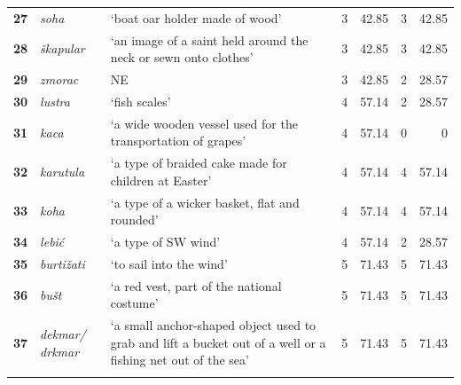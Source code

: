 \documentclass[output=paper]{LSP/langsci}
\begin{document}
\begin{table}
{\begin{tabular}{lp{2cm}p{5cm}lrlr}
{\bfseries 27} & {\itshape soha} & `boat oar holder made of wood' & 3 & 42.85 & 3 & 42.85\\

{\bfseries 28} & {\itshape škapular} & `an image of a saint held around the neck or sewn onto clothes' & 3 & 42.85 & 3 & 42.85\\

{\bfseries 29} & {\itshape zmorac} & NE & 3 & 42.85 & 2 & 28.57\\

{\bfseries 30} & {\itshape lustra} & `fish scales' & 4 & 57.14 & 2 & 28.57\\

{\bfseries 31} & {\itshape kaca} & `a wide wooden vessel used for the transportation of grapes' & 4 & 57.14 & 0 & 0\\

{\bfseries 32} & {\itshape karutula} & `a type of braided cake made for children at Easter' & 4 & 57.14 & 4 & 57.14\\

{\bfseries 33} & {\itshape koha} & `a type of a wicker basket, flat and rounded' & 4 & 57.14 & 4 & 57.14\\

{\bfseries 34} & {\itshape lebić} & `a type of SW wind' & 4 & 57.14 & 2 & 28.57\\

{\bfseries 35} & {\itshape burtižati} & `to sail into the wind' & 5 & 71.43 & 5 & 71.43\\

{\bfseries 36} & {\itshape bušt} & `a red vest, part of the national costume' & 5 & 71.43 & 5 & 71.43\\

{\bfseries 37} & {\itshape dekmar/ \mbox{drkmar}} & `a small anchor-shaped object used to grab and lift a bucket out of a well or a fishing net out of the sea' & 5 & 71.43 & 5 & 71.43\\

\lspbottomrule
\end{tabular}
}
\end{table}
\end{document}
